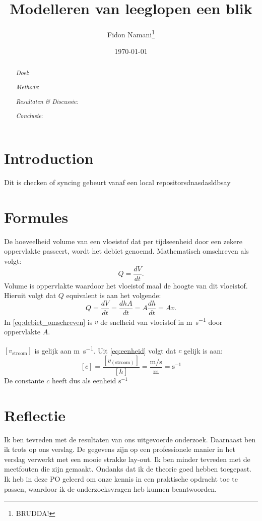 \documentclass[numbers=endperiod]{scrartcl}
\title{Modelleren van leeglopen een blik}
\author{Fidon Namani\thanks{BRUDDA!}}
\date{\today}
\begin{document}
\maketitle
\begin{abstract}
    \textit{Doel}:

    \textit{Methode}:

    \textit{Resultaten \& Discussie}:

    \textit{Conclusie}:
\end{abstract}
\section{Introduction}
Dit is checken of syncing gebeurt vanaf een local repositorsdnasdasldbsay

\section{Formules}

De hoeveelheid volume van een vloeistof dat per tijdseenheid door een zekere oppervlakte passeert, wordt het debiet genoemd. Mathematisch omschreven als volgt:
\begin{equation}\label{eq:debiet}
    Q = \frac{dV}{dt}.
\end{equation}
Volume is oppervlakte waardoor het vloeistof maal de hoogte van dit vloeistof. Hieruit volgt dat $Q$ equivalent is aan het volgende:
\begin{equation}\label{eq:debiet_omschreven}
    Q = \frac{dV}{dt} = \frac{dhA}{dt} = A\frac{dh}{dt} = Av.
\end{equation}
In \cref{eq:debiet_omschreven} is $v$ de snelheid van vloeistof in \si{\meter\per\second} door oppervlakte $A$.

$[v_{\text{stroom}}]$ is gelijk aan \si{\meter\per\second}. Uit \cref{eq:eenheid} volgt dat $c$ gelijk is aan:
\begin{equation}\label{eq:eenheid}
[c] = \frac{[v_{(\text{stroom})}]}{[h]} = \frac{\si{\meter\per\second}}{\si{\meter}} = \si{\second}^{-1}
\end{equation}
De constante $c$ heeft dus als eenheid $\si{\second}^{-1}$


\newpage
\section{Reflectie}
Ik ben tevreden met de resultaten van ons uitgevoerde onderzoek. Daarnaast
ben ik trots op ons verslag. De gegevens zijn op een professionele
manier in het verslag verwerkt met een mooie strakke lay-out. Ik ben minder
tevreden met de meetfouten die zijn gemaakt. Ondanks dat ik de theorie
goed hebben toegepast. Ik heb in deze PO geleerd om onze kennis in
een praktische opdracht toe te passen, waardoor ik de onderzoeksvragen
heb kunnen beantwoorden.
\end{document}
